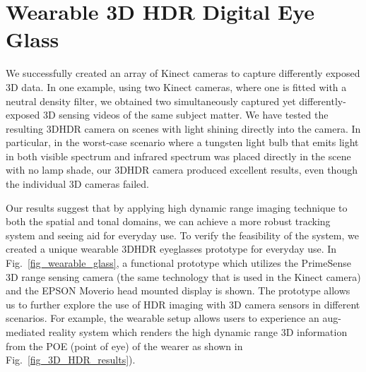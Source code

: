 

\section{Wearable 3D HDR Digital Eye Glass}
We successfully created an array of Kinect cameras to capture differently exposed 3D data. In one example, using two Kinect cameras, where one is fitted with a neutral density filter, we obtained two simultaneously captured yet differently-exposed 3D sensing videos of the same subject matter.  We have tested the resulting 3DHDR camera on scenes with light shining directly into the camera. In particular, in the worst-case scenario where a tungsten light bulb that emits light in both visible spectrum and infrared spectrum was placed directly in the scene with no lamp shade, our 3DHDR camera produced excellent results, even though the individual 3D cameras failed. 

Our results suggest that by applying high dynamic range imaging technique to both the spatial and tonal domains, we can achieve a more robust tracking system and seeing aid for everyday use. To verify the feasibility of the system, we created a unique wearable 3DHDR eyeglasses prototype for everyday use. In Fig.~\ref{fig_wearable_glass}, a functional prototype which utilizes the PrimeSense 3D range sensing camera (the same technology that is used in the Kinect camera) and the EPSON Moverio head mounted display is shown. The prototype allows us to further explore the use of HDR imaging with 3D camera sensors in different scenarios. For example, the wearable setup allows users to experience an aug-mediated reality system which renders the high dynamic range 3D information from the POE (point of eye) of the wearer as shown in Fig.~\ref{fig_3D_HDR_results}).


%
%
%

